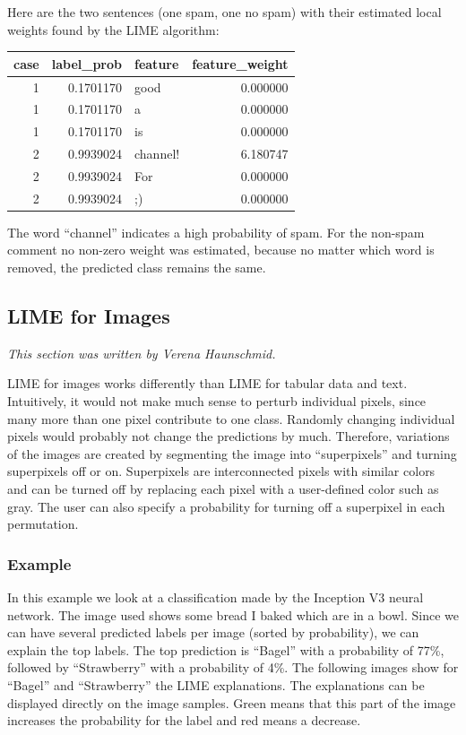 \documentclass[12pt,]{krantz}
\begin{document}
Here are the two sentences (one spam, one no spam) with their estimated
local weights found by the LIME algorithm:

\begin{tabular}{r|r|l|r}
\hline
case & label\_prob & feature & feature\_weight\\
\hline
1 & 0.1701170 & good & 0.000000\\
\hline
1 & 0.1701170 & a & 0.000000\\
\hline
1 & 0.1701170 & is & 0.000000\\
\hline
2 & 0.9939024 & channel! & 6.180747\\
\hline
2 & 0.9939024 & For & 0.000000\\
\hline
2 & 0.9939024 & ;) & 0.000000\\
\hline
\end{tabular}

The word ``channel'' indicates a high probability of spam. For the
non-spam comment no non-zero weight was estimated, because no matter
which word is removed, the predicted class remains the same.

\hypertarget{images-lime}{\subsection{LIME for
Images}\label{images-lime}}

\emph{This section was written by Verena Haunschmid.}

LIME for images works differently than LIME for tabular data and text.
Intuitively, it would not make much sense to perturb individual pixels,
since many more than one pixel contribute to one class. Randomly
changing individual pixels would probably not change the predictions by
much. Therefore, variations of the images are created by segmenting the
image into ``superpixels'' and turning superpixels off or on.
Superpixels are interconnected pixels with similar colors and can be
turned off by replacing each pixel with a user-defined color such as
gray. The user can also specify a probability for turning off a
superpixel in each permutation.

\subsubsection{Example}\label{example-7}

In this example we look at a classification made by the Inception V3
neural network. The image used shows some bread I baked which are in a
bowl. Since we can have several predicted labels per image (sorted by
probability), we can explain the top labels. The top prediction is
``Bagel'' with a probability of 77\%, followed by ``Strawberry'' with a
probability of 4\%. The following images show for ``Bagel'' and
``Strawberry'' the LIME explanations. The explanations can be displayed
directly on the image samples. Green means that this part of the image
increases the probability for the label and red means a decrease.
\end{document}
